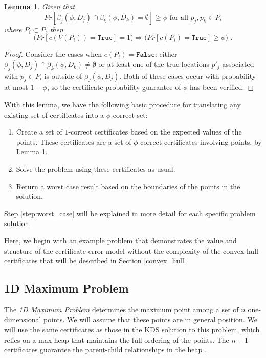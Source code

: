 \documentclass[11pt]{article}
\newtheorem{lemma}{\textbf{Lemma}}[section]
\begin{document}
\begin{lemma}
\label{lem:expected_to_phi} Given that 
\[ Pr[ \beta_j(\phi, D_j) \cap \beta_k(\phi, D_k) = \emptyset] \geq \phi \mbox{ for all } p_j, p_k \in P_i \]
where $P_i \subset P$, then
\[ \big( Pr[c(V(P_i)) = \texttt{True}] = 1 \big) \Longrightarrow \big( Pr[ c(P_i) = \texttt{True}] \geq \phi \big) \mbox{ .} \]
\end{lemma}

\begin{proof}
  Consider the cases when $c(P_i) = \texttt{False}$: either
  $\beta_j(\phi, D_j) \cap \beta_k(\phi, D_k) \not= \emptyset$
  or at least one of the true locations $p'_j$ associated with $p_j \in P_i$ is outside of
  $\beta_j(\phi, D_j)$.  Both of these cases occur with probability at most $1 - \phi$, so the certificate probability guarantee of $\phi$ has been verified.
\end{proof}

With this lemma, we have the following basic procedure for translating any existing set of certificates into a $\phi$-correct set:
\begin{enumerate}
\item Create a set of $1$-correct certificates based on the expected values of the points.  These certificates are a set of $\phi$-correct certificates involving points, by Lemma \ref{lem:expected_to_phi}.
\item Solve the problem using these certificates as usual.
\item \label{step:worst_case} Return a worst case result based on the boundaries of the points in the solution.
\end{enumerate}
Step \ref{step:worst_case} will be explained in more detail for each specific problem solution.

Here, we begin with an example problem that demonstrates the value and structure of the certificate error model without the complexity of the convex hull certificates that will be described in Section \ref{convex_hull}.  

\subsection{1D Maximum Problem} 
The \emph{1D Maximum Problem} determines
the maximum point among a set of $n$ one-dimensional points.  
We will assume that these points are in general position. 
We will use the same certificates as those in the KDS solution to this 
problem, which relies on a max
heap that maintains the full ordering of the points.  The $n-1$
certificates guarantee the parent-child relationships in the
heap \cite{Basch99MobileData}.
\end{document}
